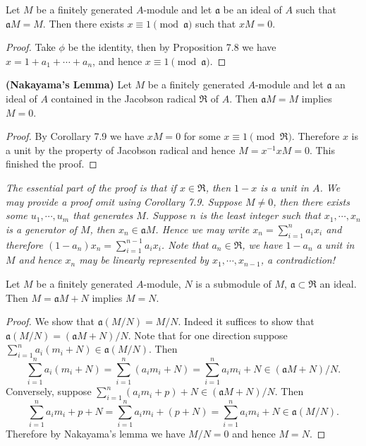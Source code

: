 \begin{corollary}
Let $M$ be a finitely generated $A$-module and let $\mathfrak{a}$ be an ideal of $A$ such that $\mathfrak{a}M=M$. Then there exists $x\equiv 1\pmod{\mathfrak{a}}$ such that $xM=0$.
\end{corollary}
\begin{proof}
Take $\phi$ be the identity, then by Proposition 7.8 we have $x=1+a_1+\cdots+a_n$, and hence $x\equiv 1\pmod{\mathfrak{a}}$.
\end{proof}
\begin{proposition}{\textbf{(Nakayama's Lemma)}}
Let $M$ be a finitely generated $A$-module and let $\mathfrak{a}$ an ideal of $A$ contained in the Jacobson radical $\mathfrak{R}$ of $A$. Then $\mathfrak{a}M=M$ implies $M=0$.
\end{proposition}
\begin{proof}
By Corollary 7.9 we have $xM=0$ for some $x\equiv 1\pmod{\mathfrak{R}}$. Therefore $x$ is a unit by the property of Jacobson radical and hence $M=x^{-1}xM=0$. This finished the proof.
\end{proof}
\begin{note}\em
The essential part of the proof is that if $x\in\mathfrak{R}$, then $1-x$ is a unit in $A$. We may provide a proof omit using Corollary 7.9. Suppose $M\ne 0$, then there exists some $u_1,\cdots,u_m$ that generates $M$. Suppose $n$ is the least integer such that $x_1,\cdots,x_n$ is a generator of $M$, then $x_n\in\mathfrak{a}M$. Hence we may write $x_n=\sum_{i=1}^na_ix_i$ and therefore $(1-a_n)x_n=\sum_{i=1}^{n-1}a_ix_i$. Note that $a_n\in\mathfrak{R}$, we have $1-a_n$ a unit in $M$ and hence $x_n$ may be linearly represented by $x_1,\cdots,x_{n-1}$, a contradiction!
\end{note}
\begin{corollary}
Let $M$ be a finitely generated $A$-module, $N$ is a submodule of $M$, $\mathfrak{a}\subset\mathfrak{R}$ an ideal. Then $M=\mathfrak{a}M+N$ implies $M=N$.
\end{corollary}
\begin{proof}
We show that $\mathfrak{a}(M/N)=M/N$. Indeed it suffices to show that $\mathfrak{a}(M/N)=(\mathfrak{a}M+N)/N$. Note that for one direction suppose $\sum_{i=1}^na_i(m_i+N)\in\mathfrak{a}(M/N)$. Then 
$$
\sum_{i=1}^n{a_i\left( m_i+N \right)}=\sum_{i=1}^n{\left( a_im_i+N \right)}=\sum_{i=1}^n{a_im_i}+N\in \left( \mathfrak{a} M+N \right) /N.
$$
Conversely, suppose $\sum_{i=1}^n(a_im_i+p)+N\in(\mathfrak{a}M+N)/N$. Then 
$$
\sum_{i=1}^n{a_im_i+p}+N=\sum_{i=1}^n{a_im_i}+\left( p+N \right) =\sum_{i=1}^n{a_im_i}+N\in \mathfrak{a} \left( M/N \right) .
$$
Therefore by Nakayama's lemma we have $M/N=0$ and hence $M=N$.
\end{proof}

